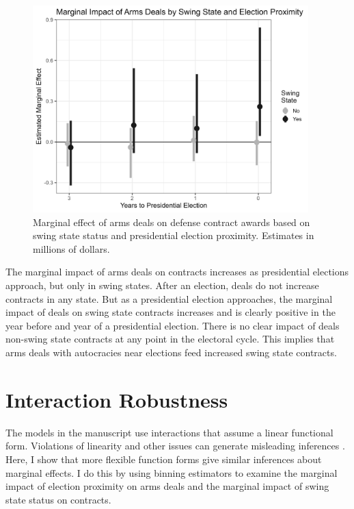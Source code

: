 \documentclass[12pt]{article}
\begin{document}
\begin{figure}[htpb]
	\centering
		\includegraphics[width=0.95\textwidth]{deals-me-prox.png}
	\caption{Marginal effect of arms deals on defense contract awards based on swing state status and presidential election proximity. Estimates in millions of dollars.}
	\label{fig:deals-me-prox}
\end{figure}


The marginal impact of arms deals on contracts increases as presidential elections approach, but only in swing states. 
After an election, deals do not increase contracts in any state. 
But as a presidential election approaches, the marginal impact of deals on swing state contracts increases and is clearly positive in the year before and year of a presidential election. 
There is no clear impact of deals non-swing state contracts at any point in the electoral cycle. 
This implies that arms deals with autocracies near elections feed increased swing state contracts. 


\section{Interaction Robustness}

The models in the manuscript use interactions that assume a linear functional form. 
Violations of linearity and other issues can generate misleading inferences \citep{Hainmuelleretal2019}. 
Here, I show that more flexible function forms give similar inferences about marginal effects. 
I do this by using binning estimators to examine the marginal impact of election proximity on arms deals and the marginal impact of swing state status on contracts.
\end{document}
